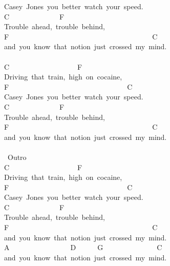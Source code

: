 {Casey\ Jones\ you\ better\ watch\ your\ speed.\\
C\ \ \ \ \ \ \ \ \ \ \ \ \ \ F\\
Trouble\ ahead,\ trouble\ behind,\\
F\ \ \ \ \ \ \ \ \ \ \ \ \ \ \ \ \ \ \ \ \ \ \ \ \ \ \ \ \ \ \ \ \ \ \ \ \ \ \ \ C\\
and\ you\ know\ that\ notion\ just\ crossed\ my\ mind.\\
\\
C\ \ \ \ \ \ \ \ \ \ \ \ \ \ \ \ \ \ \ F\\
Driving\ that\ train,\ high\ on\ cocaine,\\
F\ \ \ \ \ \ \ \ \ \ \ \ \ \ \ \ \ \ \ \ \ \ \ \ \ \ \ \ \ \ \ \ \ C\\
Casey\ Jones\ you\ better\ watch\ your\ speed.\\
C\ \ \ \ \ \ \ \ \ \ \ \ \ \ F\\
Trouble\ ahead,\ trouble\ behind,\\
F\ \ \ \ \ \ \ \ \ \ \ \ \ \ \ \ \ \ \ \ \ \ \ \ \ \ \ \ \ \ \ \ \ \ \ \ \ \ \ \ C\\
and\ you\ know\ that\ notion\ just\ crossed\ my\ mind.\\
\\
\lbrack\ Outro\rbrack\\
C\ \ \ \ \ \ \ \ \ \ \ \ \ \ \ \ \ \ \ F\\
Driving\ that\ train,\ high\ on\ cocaine,\\
F\ \ \ \ \ \ \ \ \ \ \ \ \ \ \ \ \ \ \ \ \ \ \ \ \ \ \ \ \ \ \ \ \ C\\
Casey\ Jones\ you\ better\ watch\ your\ speed.\\
C\ \ \ \ \ \ \ \ \ \ \ \ \ \ F\\
Trouble\ ahead,\ trouble\ behind,\\
F\ \ \ \ \ \ \ \ \ \ \ \ \ \ \ \ \ \ \ \ \ \ \ \ \ \ \ \ \ \ \ \ \ \ \ \ \ \ \ \ C\\
and\ you\ know\ that\ notion\ just\ crossed\ my\ mind.\\
A\ \ \ \ \ \ \ \ \ \ \ \ \ \ \ \ \ D\ \ \ \ \ \ G\ \ \ \ \ \ \ \ \ \ \ \ \ \ \ C\\
and\ you\ know\ that\ notion\ just\ crossed\ my\ mind.\\
}
